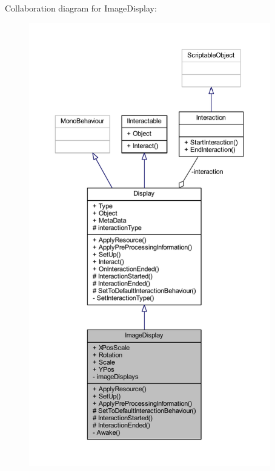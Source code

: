 Collaboration diagram for Image\+Display\+:
\nopagebreak
\begin{figure}[H]
\begin{center}
\leavevmode
\includegraphics[height=550pt]{class_image_display__coll__graph}
\end{center}
\end{figure}

